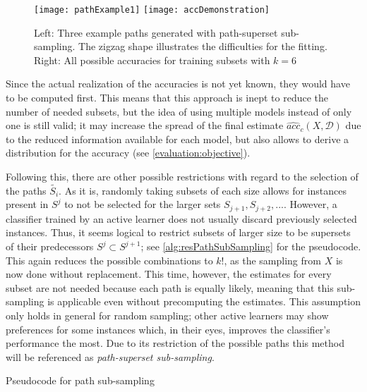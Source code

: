 \begin{figure}[h]
	\centering
	\texttt{[image: pathExample1]}
	\texttt{[image: accDemonstration]}
	\caption{Left: Three example paths generated with path-superset sub-sampling. The zigzag shape illustrates the difficulties for the fitting. Right: All possible accuracies for training subsets with $k = 6$}
	\label{fig:pathAccExamples}
\end{figure}

Since the actual realization of the accuracies is not yet known, they would have to be computed first. This means that this approach is inept to reduce the number of needed subsets, but the idea of using multiple models instead of only one is still valid; it may increase the spread of the final estimate $\widehat{acc}_c(X, \mathcal{D})$ due to the reduced information available for each model, but also allows to derive a distribution for the accuracy (see \ref{evaluation:objective}).

Following this, there are other possible restrictions with regard to the selection of the paths $\tilde{S_i}$. As it is, randomly taking subsets of each size allows for instances present in $S^j$ to not be selected for the larger sets $S_{j+1},S_{j+2},...$. However, a classifier trained by an active learner does not usually discard previously selected instances. Thus, it seems logical to restrict subsets of larger size to be supersets of their predecessors $S^j \subset S^{j+1}$; see \ref{alg:resPathSubSampling} for the pseudocode. This again reduces the possible combinations to $k!$, as the sampling from $X$ is now done without replacement. This time, however, the estimates for every subset are not needed because each path is equally likely, meaning that this sub-sampling is applicable even without precomputing the estimates. This assumption only holds in general for random sampling; other active learners may show preferences for some instances which, in their eyes, improves the classifier's performance the most. Due to its restriction of the possible paths this method will be referenced as \textit{path-superset sub-sampling}.

\begin{algorithm}[h]
	\begin{algorithmic}[1]
		\State {}
		\State {}
		\EndFor
		\State {}
		\EndFor
	\end{algorithmic}
	\caption{Pseudocode for path sub-sampling}
	\label{alg:unresPathSubSampling}
\end{algorithm}

